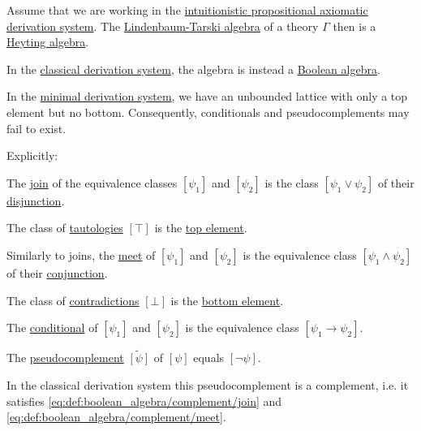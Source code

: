 \begin{proposition}\label{thm:intuitionistic_lindenbaum_tarski_algebra}
  Assume that we are working in the \hyperref[def:intuitionistic_propositional_axiomatic_derivation_system]{intuitionistic propositional axiomatic derivation system}. The \hyperref[def:lindenbaum_tarski_algebra]{Lindenbaum-Tarski algebra} of a theory \( \Gamma \) then is a \hyperref[def:heyting_algebra]{Heyting algebra}.

  In the \hyperref[def:propositional_axiomatic_derivation_system]{classical derivation system}, the algebra is instead a \hyperref[def:boolean_algebra]{Boolean algebra}.

  In the \hyperref[def:minimal_propositional_axiomatic_derivation_system]{minimal derivation system}, we have an unbounded lattice with only a top element but no bottom. Consequently, conditionals and pseudocomplements may fail to exist.

  Explicitly:
  \begin{thmenum}
     The \hyperref[def:semilattice/join]{join} of the equivalence classes \( [\psi_1] \) and \( [\psi_2] \) is the class \( [\psi_1 \vee \psi_2] \) of their \hyperref[def:propositional_language/connectives/disjunction]{disjunction}.

     The class of \hyperref[def:propositional_semantics/tautology]{tautologies} \( [\top] \) is the \hyperref[def:poset_extremal_points/top_and_bottom]{top element}.

     Similarly to joins, the \hyperref[def:semilattice/meet]{meet} of \( [\psi_1] \) and \( [\psi_2] \) is the equivalence class \( [\psi_1 \wedge \psi_2] \) of their \hyperref[def:propositional_language/connectives/conjunction]{conjunction}.

     The class of \hyperref[def:propositional_semantics/contradiction]{contradictions} \( [\bot] \) is the \hyperref[def:poset_extremal_points/top_and_bottom]{bottom element}.

     The \hyperref[eq:def:heyting_algebra/conditional]{conditional} of \( [\psi_1] \) and \( [\psi_2] \) is the equivalence class \( [\psi_1 \rightarrow \psi_2] \).

     The \hyperref[eq:def:heyting_algebra/pseudocomplement]{pseudocomplement} \( \widetilde{[\psi]} \) of \( [\psi] \) equals \( [\neg \psi] \).

    In the classical derivation system this pseudocomplement is a complement, i.e. it satisfies \eqref{eq:def:boolean_algebra/complement/join} and \eqref{eq:def:boolean_algebra/complement/meet}.
  \end{thmenum}
\end{proposition}
